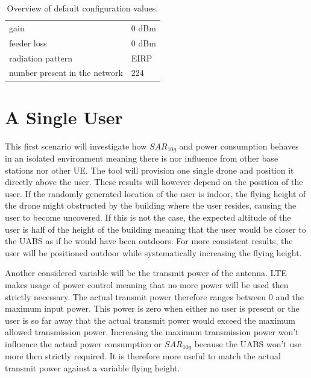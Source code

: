 \begin{table}[!htb]
\begin{tabular}[t]{ll}
        \hspace{3mm} gain                      & 0 dBm   \\ 
        \hspace{3mm} feeder loss               & 0 dBm   \\ 
        \hspace{3mm} radiation pattern         & \acs{EIRP}  \\
        \hspace{3mm} number present in the network         & 224  \\
        \toprule
\end{tabular}
\caption{Overview of default configuration values.}
\label{table:defaultconf}
\end{table}

\section{A Single User}
\label{sec:scenarios_s1}

This first scenario will investigate how $SAR_{10g}$ and power consumption behaves in an isolated environment meaning there is nor influence 
from other base stations nor other \gls{UE}. The tool will provision one single drone and position it directly above the user.
These results will however depend on the position of the user. If the randomly generated location of the user is indoor, 
the flying height of the drone might obstructed by the building where the user resides, causing the user to become uncovered. If this is not the case,
the expected altitude of the user is half of the height of the building meaning that the user would be closer to the \gls{UABS} as 
if he would have been outdoors. For more consistent results, the user will be positioned outdoor while systematically 
increasing the flying height. 

Another considered variable will be the transmit power of the antenna.
\gls{LTE} makes usage of power control meaning that no more power will be used then strictly necessary. The actual 
transmit power therefore ranges between 0 and the maximum input power. This power is zero when either no user is 
present or the user is so far away that the actual transmit power would exceed the maximum allowed transmission power.
Increasing the maximum transmission power won't influence the actual power consumption or $SAR_{10g}$ because the \gls{UABS} won't use more
then strictly required. It is therefore more useful to match the actual transmit power against a variable flying height.

